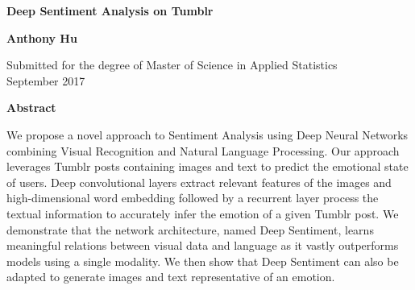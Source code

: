 \newpage
\thispagestyle{plain}
\begin{center}
  \textbf{\Large Deep Sentiment Analysis on Tumblr}

  \vspace*{1cm}
  \textbf{\large Anthony Hu}

  \vspace*{0.5cm}
  {\large Submitted for the degree of Master of Science in Applied Statistics\\ September 2017}

  \vspace*{1cm}
  \textbf{\large Abstract}
\end{center}
We propose a novel approach to Sentiment Analysis using Deep Neural Networks combining Visual Recognition and Natural Language Processing. Our approach leverages Tumblr posts containing images and text to predict the emotional state of users. Deep convolutional layers extract relevant features of the images and high-dimensional word embedding followed by a recurrent layer process the textual information to accurately infer the emotion of a given Tumblr post. We demonstrate that the network architecture, named Deep Sentiment, learns meaningful relations between visual data and language as it vastly outperforms models using a single modality. We then show that Deep Sentiment can also be adapted to generate images and text representative of an emotion. 

\begin{spacing}{0.95}
\tableofcontents
\end{spacing}
\listoffigures
\listoftables
\clearpage











